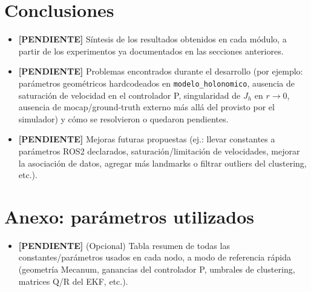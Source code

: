 \documentclass[11pt,a4paper]{article}
\newcommand{\TODO}[1]{\textcolor{todocolor}{\textbf{[PENDIENTE]} #1}}
\newenvironment{tareas}{\begin{itemize}\setlength{\itemsep}{2pt}}{\end{itemize}}
\begin{document}
\section{Conclusiones}
\begin{tareas}
    \item \TODO{Síntesis de los resultados obtenidos en cada módulo, a partir de los experimentos ya documentados en las secciones anteriores.}
    \item \TODO{Problemas encontrados durante el desarrollo (por ejemplo: parámetros geométricos hardcodeados en \texttt{modelo\_holonomico}, ausencia de saturación de velocidad en el controlador P, singularidad de $J_h$ en $r\to0$, ausencia de mocap/ground-truth externo más allá del provisto por el simulador) y cómo se resolvieron o quedaron pendientes.}
    \item \TODO{Mejoras futuras propuestas (ej.: llevar constantes a parámetros ROS2 declarados, saturación/limitación de velocidades, mejorar la asociación de datos, agregar más landmarks o filtrar outliers del clustering, etc.).}
\end{tareas}

\appendix
\section{Anexo: parámetros utilizados}
\begin{tareas}
    \item \TODO{(Opcional) Tabla resumen de todas las constantes/parámetros usados en cada nodo, a modo de referencia rápida (geometría Mecanum, ganancias del controlador P, umbrales de clustering, matrices Q/R del EKF, etc.).}
\end{tareas}
\end{document}
